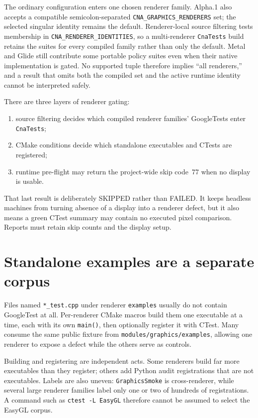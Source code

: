 The ordinary configuration enters one chosen renderer family.  Alpha.1 also accepts a compatible
semicolon-separated \texttt{CNA\_GRAPHICS\_RENDERERS} set; the selected singular identity remains
the default.  Renderer-local source filtering tests membership in
\texttt{CNA\_RENDERER\_IDENTITIES}, so a multi-renderer \texttt{CnaTests} build retains the suites
for every compiled family rather than only the default.  Metal and Glide still contribute some
portable policy suites even when their native implementation is gated.  No supported tuple
therefore implies ``all renderers,'' and a result that omits both the compiled set and the active
runtime identity cannot be interpreted safely.

There are three layers of renderer gating:

\begin{enumerate}
  \item source filtering decides which compiled renderer families' GoogleTests enter
        \texttt{CnaTests};
  \item CMake conditions decide which standalone executables and CTests are registered;
  \item runtime pre-flight may return the project-wide skip code~77 when no display is usable.
\end{enumerate}

That last result is deliberately SKIPPED rather than FAILED.  It keeps headless machines from
turning absence of a display into a renderer defect, but it also means a green CTest summary may
contain no executed pixel comparison.  Reports must retain skip counts and the display setup.

\section{Standalone examples are a separate corpus}

Files named \texttt{*\_test.cpp} under renderer \texttt{examples} usually do not contain
GoogleTest at all.  Per-renderer CMake macros build them one executable at a time, each with its
own \texttt{main()}, then optionally register it with CTest.  Many consume the same public
fixture from \texttt{modules/graphics/examples}, allowing one renderer to expose a defect while
the others serve as controls.

Building and registering are independent acts.  Some renderers build far more executables than
they register; others add Python audit registrations that are not executables.  Labels are also
uneven: \texttt{GraphicsSmoke} is cross-renderer, while several large renderer families label
only one or two of hundreds of registrations.  A command such as \texttt{ctest -L EasyGL}
therefore cannot be assumed to select the EasyGL corpus.

